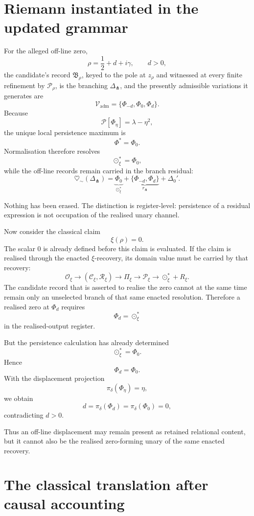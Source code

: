 \documentclass[11pt]{article}
\newcommand{\heartsim}{\heartsuit_{\sim}}
\newcommand{\Cctx}{\mathcal C}
\newcommand{\Rres}{\mathcal R}
\newcommand{\Pheart}{\mathcal P}
\newcommand{\DeltaFork}{\Delta_{\pitchfork}}
\begin{document}
\section{Riemann instantiated in the updated grammar}

For the alleged off-line zero,
\[
\rho=\frac12+d+i\gamma,
\qquad d>0,
\]
the candidate's record \(\mathfrak B_\rho\), keyed to the pole at \(z_\rho\) and witnessed at every finite refinement by \(\mathcal P_\rho\), is the branching \(\DeltaFork\), and the presently admissible variations it generates are
\[
\mathcal V_{\mathrm{adm}}
=
\{\Phi_{-d},\Phi_0,\Phi_d\}.
\]
Because
\[
\Pheart[\Phi_\eta]
=
\lambda-\eta^2,
\]
the unique local persistence maximum is
\[
\Phi^\ast=\Phi_0.
\]
Normalisation therefore resolves
\[
\odot_\xi^\ast=\Phi_0,
\]
while the off-line records remain carried in the branch residual:
\[
\heartsim(\DeltaFork)
=
\underbrace{\Phi_0}_{\odot_\xi^\ast}
+
\underbrace{\{\Phi_{-d},\Phi_d\}}_{r_{\pitchfork}}
+
\Delta_0'.
\]

Nothing has been erased. The distinction is register-level: persistence of a residual expression is not occupation of the realised unary channel.

Now consider the classical claim
\[
\xi(\rho)=0.
\]
The scalar \(0\) is already defined before this claim is evaluated. If the claim is realised through the enacted \(\xi\)-recovery, its domain value must be carried by that recovery:
\[
\mathcal O_\xi
\longrightarrow
(\Cctx_\xi,\Rres_\xi)
\longrightarrow
\Pi_\xi
\longrightarrow
\Pheart_\xi
\longrightarrow
\odot_\xi^\ast+R_\xi.
\]
The candidate record that is asserted to realise the zero cannot at the same time remain only an unselected branch of that same enacted resolution. Therefore a realised zero at \(\Phi_d\) requires
\[
\Phi_d=\odot_\xi^\ast
\]
in the realised-output register.

But the persistence calculation has already determined
\[
\odot_\xi^\ast=\Phi_0.
\]
Hence
\[
\Phi_d=\Phi_0.
\]
With the displacement projection
\[
\pi_\delta(\Phi_\eta)=\eta,
\]
we obtain
\[
d
=
\pi_\delta(\Phi_d)
=
\pi_\delta(\Phi_0)
=
0,
\]
contradicting \(d>0\).

Thus an off-line displacement may remain present as retained relational content, but it cannot also be the realised zero-forming unary of the same enacted recovery.

\section{The classical translation after causal accounting}
\end{document}
